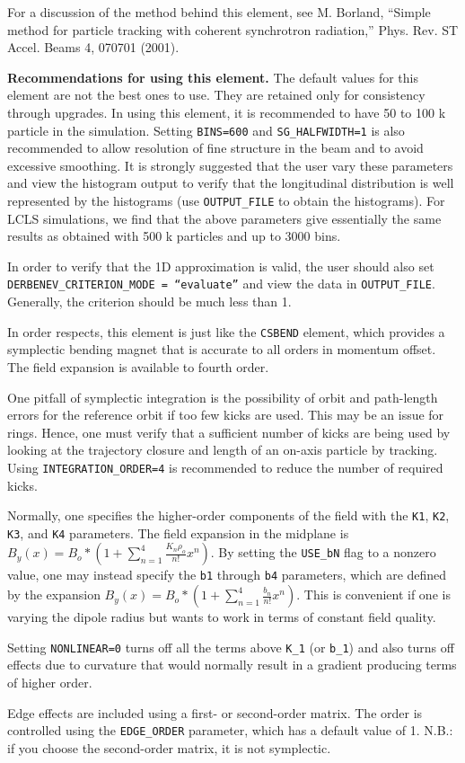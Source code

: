 For a discussion of the method behind this element, see M. Borland,
``Simple method for particle tracking with coherent synchrotron
radiation,'' Phys. Rev. ST Accel. Beams 4, 070701 (2001).

{\bf Recommendations for using this element.}  The default values for
this element are not the best ones to use.  They are retained only for
consistency through upgrades.  In using this element, it is
recommended to have 50 to 100 k particle in the simulation.  Setting
{\tt BINS=600} and {\tt SG\_HALFWIDTH=1} is also recommended to allow
resolution of fine structure in the beam and to avoid excessive
smoothing.  It is strongly suggested that the user vary these
parameters and view the histogram output to verify that the
longitudinal distribution is well represented by the histograms (use
{\tt OUTPUT\_FILE} to obtain the histograms).  For LCLS simulations,
we find that the above parameters give essentially the same results as
obtained with 500 k particles and up to 3000 bins.

In order to verify that the 1D approximation is valid, the user should
also set {\tt DERBENEV\_CRITERION\_MODE = ``evaluate''} and view
the data in {\tt OUTPUT\_FILE}.  Generally, the criterion should be
much less than 1.


In order respects, this element is just like the {\tt CSBEND} element,
which provides a symplectic bending magnet that is accurate to all
orders in momentum offset.  The field expansion is available to fourth
order.

One pitfall of symplectic integration is the possibility of orbit and
path-length errors for the reference orbit if too few kicks are used.
This may be an issue for rings.  Hence, one must verify that a
sufficient number of kicks are being used by looking at the trajectory
closure and length of an on-axis particle by tracking.  Using 
{\tt INTEGRATION\_ORDER=4} is recommended to reduce the number of
required kicks.

Normally, one specifies the higher-order components of the field with
the {\tt K1}, {\tt K2}, {\tt K3}, and {\tt K4} parameters. The field
expansion in the midplane is $B_y(x) = B_o * (1 +
\sum_{n=1}^4\frac{K_n\rho_o}{n!}x^n)$.  By setting the {\tt USE\_bN}
flag to a nonzero value, one may instead specify the {\tt b1} through
{\tt b4} parameters, which are defined by the expansion $B_y(x) = B_o
* (1 + \sum_{n=1}^4\frac{b_n}{n!}x^n)$.  This is convenient if one is
varying the dipole radius but wants to work in terms of constant field
quality.  

Setting {\tt NONLINEAR=0} turns off all the terms above {\tt K\_1} (or {\tt b\_1}) and
also turns off effects due to curvature that would
normally result in a gradient producing terms of higher order.

Edge effects are included using a first- or second-order matrix.  The
order is controlled using the {\tt EDGE\_ORDER} parameter, which has a
default value of 1.  N.B.: if you choose the second-order matrix, it
is not symplectic.
